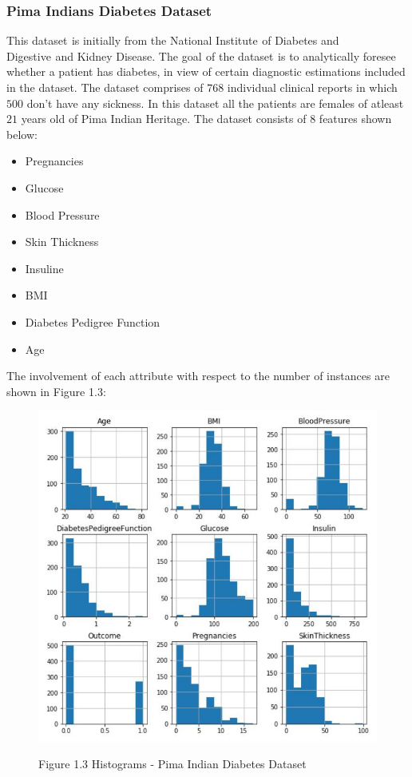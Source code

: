 \documentclass[oneside,12pt]{Classes/VTU}
\begin{document}
	\subsubsection{Pima Indians Diabetes Dataset}
	
	This dataset\tiny\textcolor{white}{s}\normalsize is initially from the National Institute\tiny\textcolor{white}{s}\normalsize of Diabetes and Digestive\tiny\textcolor{white}{s}\normalsize and Kidney Disease. The goal\tiny\textcolor{white}{s}\normalsize of the dataset\tiny\textcolor{white}{s}\normalsize is to analytically foresee whether a patient has diabetes, in view of certain diagnostic estimations included in the dataset. The dataset comprises of $768$ individual clinical reports in which $500$ don't have any sickness. In this dataset all the patients are females of atleast $21$ years old of Pima Indian Heritage. 
	The dataset consists of $8$ features shown below:
	\begin{itemize}
		\item Pregnancies
		\item Glucose
		\item Blood Pressure 
		\item Skin Thickness
		\item Insuline
		\item BMI
		\item Diabetes Pedigree Function
		\item Age
	\end{itemize}
	The involvement of each attribute with respect to the number of instances are shown in Figure 1.3:\\
	\linebreak
	\begin{figure}	
		\begin{center}
			\includegraphics[scale=0.6]{images/diabeteshistogram.jpeg}
		\end{center}
	
		\begin{center}
			Figure 1.3 Histograms - Pima Indian Diabetes Dataset
		\end{center}
	\end{figure}
\end{document}
